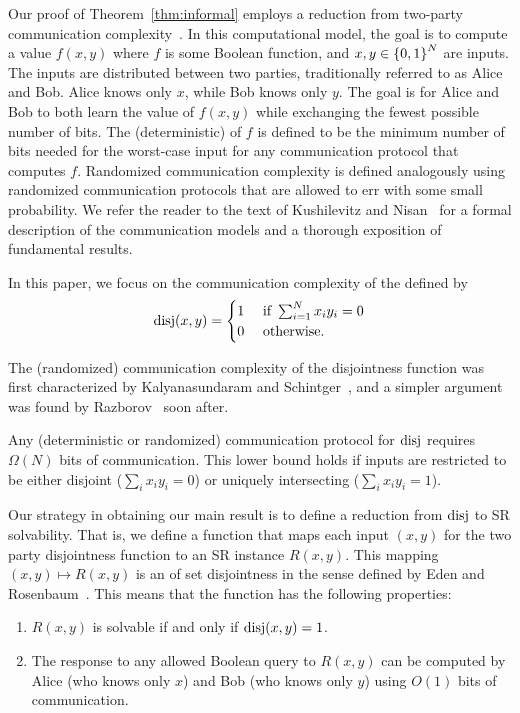 Our proof of Theorem~\ref{thm:informal} employs a reduction from two-party communication complexity~\cite{Yao79}. In this computational model, the goal is to compute a value $f(x, y)$ where $f$ is some Boolean function, and $x, y \in \left\{0, 1\right\}^N$ are inputs. The inputs are distributed between two parties, traditionally referred to as Alice and Bob. Alice knows only $x$, while Bob knows only $y$. The goal is for Alice and Bob to both learn the value of $f(x, y)$ while exchanging the fewest possible number of bits. The (deterministic)  of $f$ is defined to be the minimum number of bits needed for the worst-case input for any communication protocol that computes $f$. Randomized communication complexity is defined analogously using randomized communication protocols that are allowed to err with some small probability. We refer the reader to the text of Kushilevitz and Nisan~\cite{KN97} for a formal description of the communication models and a thorough exposition of fundamental results.

In this paper, we focus on the communication complexity of the  defined by
\begin{equation}
    \operatorname{disj}(x, y) = 
    \begin{cases}
        1 &\text{ if } \sum_{i = 1}^N x_i y_i = 0\\
        0 &\text{ otherwise.}
    \end{cases}
\end{equation}


The (randomized) communication complexity of the disjointness function was first characterized by Kalyanasundaram and Schintger~\cite{KS92}, and a simpler argument was found by Razborov~\cite{Razborov92} soon after. 

\begin{thm}\label{thm:disjointness}
    Any (deterministic or randomized) communication protocol for $\operatorname{disj}$ requires $\Omega(N)$ bits of communication. This lower bound holds if inputs are restricted to be either disjoint ($\sum_i x_i y_i = 0$) or uniquely intersecting ($\sum_i x_i y_i = 1$).
\end{thm}


Our strategy in obtaining our main result is to define a reduction from $\operatorname{disj}$ to SR solvability. That is, we define a function that maps each input $(x, y)$ for the two party disjointness function to an SR instance $R(x,y)$. This mapping $(x, y) \mapsto R(x, y)$ is an  of set disjointness in the sense defined by Eden and Rosenbaum~\cite{Eden2018-lower}. This means that the function has the following properties:
\begin{enumerate}
    \item $R(x, y)$ is solvable if and only if $\operatorname{disj}(x, y) = 1$.
    \item The response to any allowed Boolean query to $R(x, y)$ can be computed by Alice (who knows only $x$) and Bob (who knows only $y$) using $O(1)$ bits of communication.
\end{enumerate}

